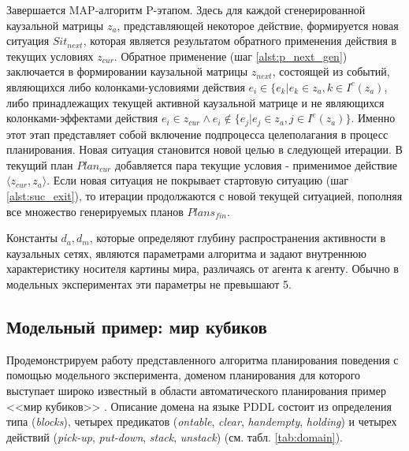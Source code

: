 \documentclass[12pt]{report}
\begin{document}
	Завершается MAP-алгоритм P-этапом. Здесь для каждой сгенерированной каузальной матрицы $z_a$, представляющей некоторое действие, формируется новая ситуация $Sit_{next}$, которая является результатом обратного применения действия в текущих условиях $z_{cur}$. Обратное применение (шаг \ref{alst:p_next_gen}) заключается в формировании каузальной матрицы $z_{next}$, состоящей из событий, являющихся либо колонками-условиями действия $e_i\in\{e_k|e_k\in z_a, k\in I^c(z_a)$, либо принадлежащих текущей активной каузальной матрице и не являющихся колонками-эффектами действия $e_i\in z_{cur} \land e_i\not\in\{e_j|e_j\in z_a, j\in I^e(z_a)\}$. Именно этот этап представляет собой включение подпроцесса целеполагания в процесс планирования. Новая ситуация становится новой целью в следующей итерации. В текущий план $Plan_{cur}$ добавляется пара текущие условия - применимое действие $\langle z_{cur}, z_a\rangle$. Если новая ситуация не покрывает стартовую ситуацию (шаг \ref{alst:suc_exit}), то итерации продолжаются с новой текущей ситуацией, пополняя все множество генерируемых планов $Plans_{fin}$.
	
	Константы $d_a, d_m$, которые определяют глубину распространения активности в каузальных сетях, являются параметрами алгоритма и задают внутреннюю характеристику носителя картины мира, различаясь от агента к агенту. Обычно в модельных экспериментах эти параметры не превышают 5. 
		
	\begin{algorithm}
		\begin{algorithmic}[1]
			
		\end{algorithmic}
	\end{algorithm}
	
	\subsection{Модельный пример: мир кубиков}\label{sec:example}
	
	Продемонстрируем работу представленного алгоритма планирования поведения с помощью модельного эксперимента, доменом планирования для которого выступает широко известный в области автоматического планирования пример <<мир кубиков>> \cite{Gupta1992}. Описание домена на языке PDDL \cite{Gerevini2009} состоит из определения типа (\textit{blocks}), четырех предикатов (\textit{ontable}, \textit{clear}, \textit{handempty}, \textit{holding}) и четырех действий (\textit{pick-up}, \textit{put-down}, \textit{stack}, \textit{unstack}) (см. табл. \ref{tab:domain}).
	
\end{document}
